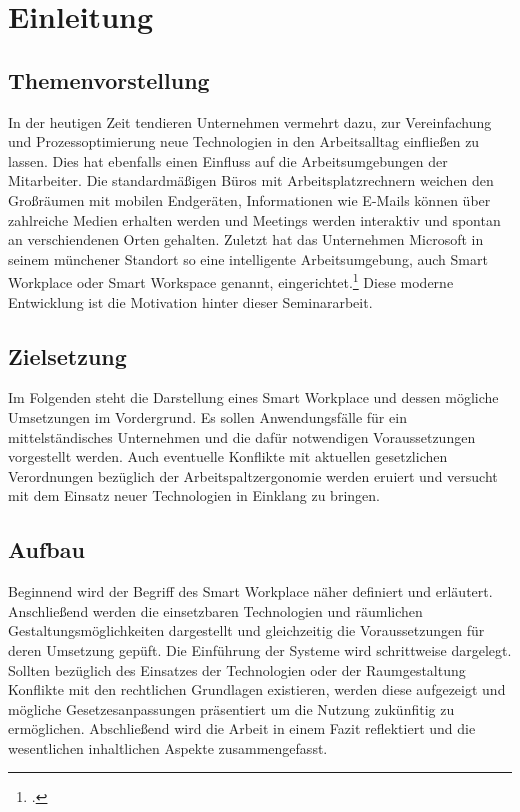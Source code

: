 \section{Einleitung}
\subsection{Themenvorstellung}
In der heutigen Zeit tendieren Unternehmen vermehrt dazu, zur Vereinfachung und Prozessoptimierung neue Technologien in den Arbeitsalltag einfließen zu lassen. Dies hat ebenfalls einen Einfluss auf die Arbeitsumgebungen der Mitarbeiter. Die standardmäßigen Büros mit Arbeitsplatzrechnern weichen den Großräumen mit mobilen Endgeräten, Informationen wie E-Mails können über zahlreiche Medien erhalten werden und Meetings werden interaktiv und spontan an verschiendenen Orten gehalten. Zuletzt hat das Unternehmen Microsoft in seinem münchener Standort so eine intelligente Arbeitsumgebung, auch Smart Workplace oder Smart Workspace genannt, eingerichtet.\footcite[Vgl.][]{MicrosoftArtikel} Diese moderne Entwicklung ist die Motivation hinter dieser Seminararbeit.

\subsection{Zielsetzung}
Im Folgenden steht die Darstellung eines Smart Workplace und dessen mögliche Umsetzungen im Vordergrund. Es sollen Anwendungsfälle für ein mittelständisches Unternehmen und die dafür notwendigen Voraussetzungen vorgestellt werden. Auch eventuelle Konflikte mit aktuellen gesetzlichen Verordnungen bezüglich der Arbeitspaltzergonomie werden eruiert und versucht mit dem Einsatz neuer Technologien in Einklang zu bringen.

\subsection{Aufbau}
Beginnend wird der Begriff des Smart Workplace näher definiert und erläutert. Anschließend werden die einsetzbaren Technologien und räumlichen Gestaltungsmöglichkeiten dargestellt und gleichzeitig die Voraussetzungen für deren Umsetzung gepüft. Die Einführung der Systeme wird schrittweise dargelegt. Sollten bezüglich des Einsatzes der Technologien oder der Raumgestaltung Konflikte mit den rechtlichen Grundlagen existieren, werden diese aufgezeigt und mögliche Gesetzesanpassungen präsentiert um die Nutzung zukünfitig zu ermöglichen. Abschließend wird die Arbeit in einem Fazit reflektiert und die wesentlichen inhaltlichen Aspekte zusammengefasst.